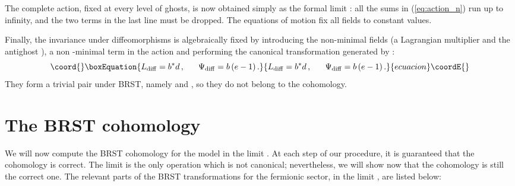 \documentclass[a4paper,12pt]{article}
\begin{document}
The complete action, fixed at every level of ghosts, is now obtained
simply as the formal limit \coordHE{}: all the sums in
(\ref{eq:action_n}) run up to infinity, and the two terms in the last
line must be dropped.  The equations of motion fix all fields to
constant values.  

Finally, the invariance under diffeomorphisms is algebraically fixed 
by introducing the non-minimal fields (a Lagrangian multiplier \coordHE{} and the 
antighost \coordHE{}), a non -minimal term in the action and performing the 
canonical transformation generated by \coordHE{}: 
\begin{equation}\coord{}\boxEquation{
  \label{diff_ga}
  L_{\rm diff} = b^* d \,, ~~~~~ \Psi_{\rm diff} = b \, ( e - 1)\,. 
}{
  L_{\rm diff} = b^* d \,, ~~~~~ \Psi_{\rm diff} = b \, ( e - 1)\,. 
}{ecuacion}\coordE{}\end{equation}
They form a trivial pair under BRST, namely \coordHE{} and \coordHE{}, so they 
do not belong to the cohomology. 



\section{The BRST cohomology}
\label{sec:cohomology}

We will now compute the BRST cohomology for the model in the limit \coordHE{}. At each step of our procedure, it is guaranteed that the
cohomology is correct. The limit is the only operation which is not
canonical; nevertheless, we will show now that the cohomology is still
the correct one.  
The relevant parts of the BRST transformations for the fermionic 
sector, in the limit \coordHE{}, are listed below:
\end{document}
